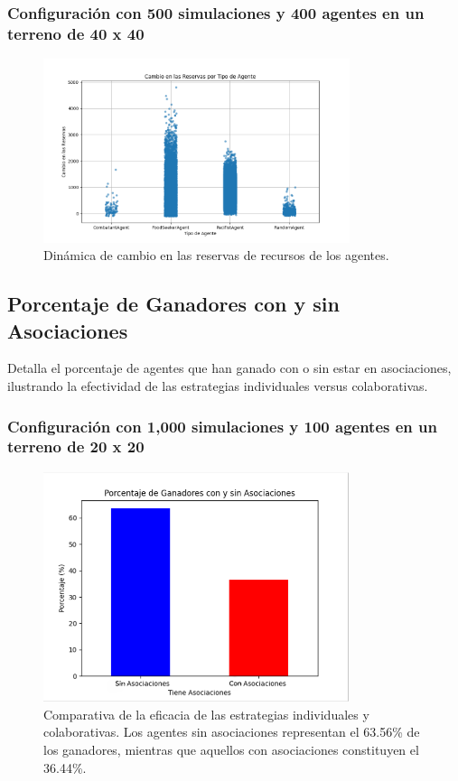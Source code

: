\documentclass[11pt]{article}
\begin{document}
\subsubsection{Configuración con 500 simulaciones y 400 agentes en un terreno de 40 x 40}
\begin{figure}[H]
    \centering
    \includegraphics[width=0.8\textwidth]{images/reserves_change_num_simulations500_size40x40_agents_count500.png}
    \caption{Dinámica de cambio en las reservas de recursos de los agentes.}
\end{figure}


\subsection{Porcentaje de Ganadores con y sin Asociaciones}

Detalla el porcentaje de agentes que han ganado con o sin estar en asociaciones, ilustrando la efectividad de las estrategias individuales versus colaborativas.
\subsubsection{Configuración con 1,000 simulaciones y 100 agentes en un terreno de 20 x 20}
\begin{figure}[H]
    \centering
    \includegraphics[width=0.8\textwidth]{images/Figure_5.png}
    \caption{Comparativa de la eficacia de las estrategias individuales y colaborativas. Los agentes sin asociaciones representan el 63.56\% de los ganadores, mientras que aquellos con asociaciones constituyen el 36.44\%.}

\end{figure}
\end{document}
